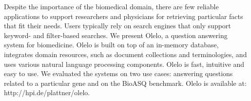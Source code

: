 Despite the importance of the biomedical domain, there are few reliable applications to support researchers and physicians for retrieving particular facts that fit their needs. Users typically rely on search engines that only support keyword- and filter-based searches. We present Olelo, a question answering system for biomedicine. Olelo is built on top of an in-memory database, integrates domain resources, such as document collections and terminologies, and uses various natural language processing components. Olelo is fast, intuitive and easy to use. We evaluated the systems on two use cases: answering questions related to a particular gene and on the BioASQ benchmark. Olelo is available at: http://hpi.de/plattner/olelo.
